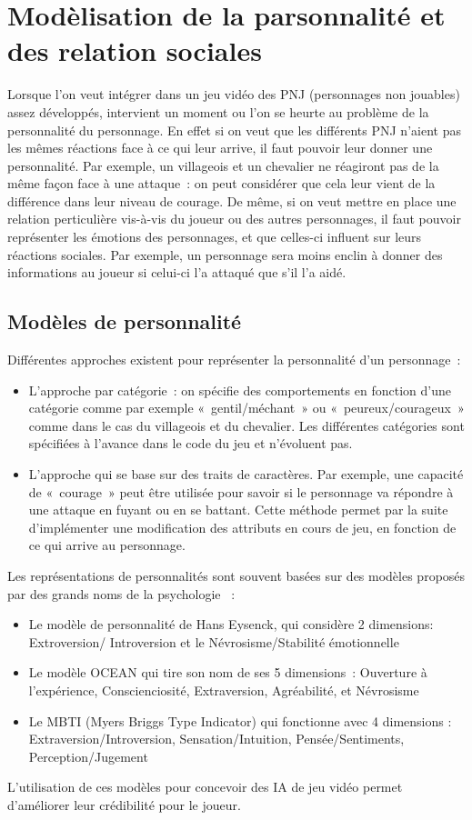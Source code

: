 \documentclass[asi]{picINSA}
\begin{document}
\chapter{Modèlisation de la parsonnalité et des relation sociales}
Lorsque l'on veut intégrer dans un jeu vidéo des PNJ (personnages non jouables) assez développés, intervient un moment ou l'on se heurte au problème de la personnalité du personnage. En effet si on veut que les différents PNJ n'aient pas les mêmes réactions face à ce qui leur arrive, il faut pouvoir leur donner une personnalité. Par exemple, un villageois et un chevalier ne réagiront pas de la même façon face à une attaque : on peut considérer que cela leur vient de la différence dans leur niveau de courage. De même, si on veut mettre en place une relation perticulière vis-à-vis du joueur ou des autres personnages, il faut pouvoir représenter les émotions des personnages, et que celles-ci influent sur leurs réactions sociales. Par exemple, un personnage sera moins enclin à donner des informations au joueur si celui-ci l'a attaqué que s’il l'a aidé. 

\section{Modèles de personnalité}
Différentes approches existent pour représenter la personnalité d'un personnage :
\begin{itemize}
\item L'approche par catégorie : on spécifie des comportements en fonction d'une catégorie comme par exemple « gentil/méchant » ou « peureux/courageux » comme dans le cas du villageois et du chevalier. Les différentes catégories sont spécifiées à l'avance dans le code du jeu et n'évoluent pas.
\item L'approche qui se base sur des traits de caractères. Par exemple, une capacité de « courage » peut être utilisée pour savoir si le personnage va répondre à une attaque en fuyant ou en se battant. Cette méthode permet par la suite d'implémenter une modification des attributs en cours de jeu, en fonction de ce qui arrive au personnage.  
\end{itemize}
Les représentations de personnalités sont souvent basées sur des modèles proposés par des grands noms de la psychologie  :
\begin{itemize}
\item Le modèle de personnalité de Hans Eysenck, qui considère 2 dimensions: Extroversion/ Introversion et  le Névrosisme/Stabilité émotionnelle
\item Le modèle OCEAN qui tire son nom de ses 5 dimensions : Ouverture à l'expérience, Conscienciosité, Extraversion, Agréabilité, et Névrosisme
\item Le MBTI (Myers Briggs Type Indicator) qui fonctionne avec 4 dimensions : Extraversion/Introversion, Sensation/Intuition, Pensée/Sentiments, Perception/Jugement
\end{itemize}
L'utilisation de ces modèles pour concevoir des IA de jeu vidéo permet d'améliorer leur crédibilité pour le joueur.
\end{document}
